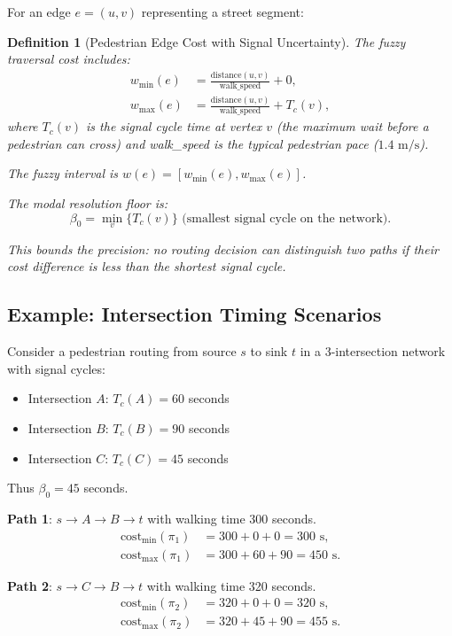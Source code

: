 \documentclass[twocolumn,11pt,a4paper]{article}
\newtheorem{definition}[theorem]{Definition}
\theoremstyle{definition}
\begin{document}
For an edge $e = (u, v)$ representing a street segment:

\begin{definition}[Pedestrian Edge Cost with Signal Uncertainty]
The fuzzy traversal cost includes:
\begin{align}
w_{\min}(e) &= \frac{\text{distance}(u,v)}{\text{walk\_speed}} + 0, \\
w_{\max}(e) &= \frac{\text{distance}(u,v)}{\text{walk\_speed}} + T_c(v),
\end{align}
where $T_c(v)$ is the signal cycle time at vertex $v$ (the maximum wait before a pedestrian can cross) and walk\_speed is the typical pedestrian pace ($1.4 \text{ m/s}$).

The fuzzy interval is $w(e) = [w_{\min}(e), w_{\max}(e)]$.

The modal resolution floor is:
\begin{equation}
\beta_0 = \min_v \{T_c(v)\} \text{ (smallest signal cycle on the network)}.
\end{equation}

This bounds the precision: no routing decision can distinguish two paths if their cost difference is less than the shortest signal cycle.
\end{definition}

\subsection{Example: Intersection Timing Scenarios}

Consider a pedestrian routing from source $s$ to sink $t$ in a 3-intersection network with signal cycles:
\begin{itemize}
\item Intersection $A$: $T_c(A) = 60$ seconds
\item Intersection $B$: $T_c(B) = 90$ seconds
\item Intersection $C$: $T_c(C) = 45$ seconds
\end{itemize}

Thus $\beta_0 = 45$ seconds.

\textbf{Path 1}: $s \to A \to B \to t$ with walking time 300 seconds.
\begin{align}
\text{cost}_{\min}(\pi_1) &= 300 + 0 + 0 = 300 \text{ s}, \\
\text{cost}_{\max}(\pi_1) &= 300 + 60 + 90 = 450 \text{ s}.
\end{align}

\textbf{Path 2}: $s \to C \to B \to t$ with walking time 320 seconds.
\begin{align}
\text{cost}_{\min}(\pi_2) &= 320 + 0 + 0 = 320 \text{ s}, \\
\text{cost}_{\max}(\pi_2) &= 320 + 45 + 90 = 455 \text{ s}.
\end{align}
\end{document}
